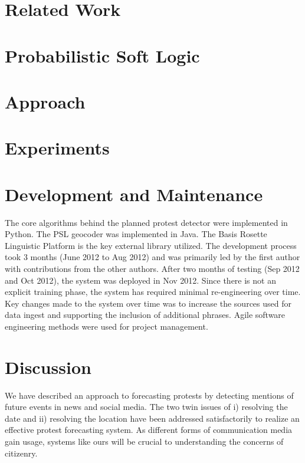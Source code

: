 \documentclass[letterpaper]{article}
\begin{document}
\section{Related Work}


\section{Probabilistic Soft Logic}

\label{section:PSL}

\section{Approach}


\section{Experiments}


\section{Development and Maintenance}
The core algorithms behind the
planned protest detector were implemented in Python. The PSL geocoder was
implemented in Java. The Basis Rosette Linguistic Platform is the key
external library utilized. The development process took 3 months (June
2012 to Aug 2012) and was
primarily led by the first author with contributions from the other authors.
After two months of testing (Sep 2012 and Oct 2012), the system was deployed
in Nov 2012. Since there is not an explicit training
phase, the system has required minimal re-engineering over time. Key changes
made to the system over time was to increase the sources used for data ingest
and supporting the inclusion of additional phrases. Agile software
engineering methods were used for project management.

\section{Discussion}
We have described an approach to forecasting protests by detecting
mentions of future events in news and social media. The two twin issues
of i) resolving the date and ii) resolving the location have been
addressed satisfactorily to realize an effective protest forecasting
system. As different forms of communication media gain usage, systems
like ours will be crucial to understanding the concerns of citizenry.
\end{document}

